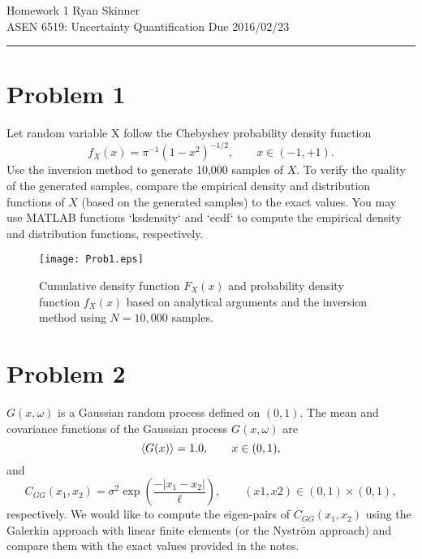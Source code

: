 \documentclass[11pt]{article}
\begin{document}
\renewcommand*{\arraystretch}{1.5}

\pagestyle{fancyplain}
\lhead{}
\chead{}
\rhead{}
\cfoot{\hrule \thepage}

\noindent
{\Large Homework 1}
\hfill
{\large Ryan Skinner}
\\[0.5ex]
{\large ASEN 6519: Uncertainty Quantification}
\hfill
{\large Due 2016/02/23}\\
\hrule
\vspace{6pt}

\section*{Problem 1} %

Let random variable X follow the Chebyshev probability density function
\begin{equation}
f_X(x) = \pi^{-1} (1 - x^2)^{-1/2}, \qquad x \in (-1, +1).
\end{equation}
Use the inversion method to generate 10,000 samples of $X$. To verify the quality of the generated samples, compare the empirical density and distribution functions of $X$ (based on the generated samples) to the exact values. You may use MATLAB functions `ksdensity` and `ecdf` to compute the empirical density and distribution functions, respectively.

\begin{figure}[h]
\centering
\texttt{[image: Prob1.eps]}
\caption{Cumulative density function $F_X(x)$ and probability density function $f_X(x)$ based on analytical arguments and the inversion method using $N=10,\!000$ samples.}
\end{figure}

\section*{Problem 2} %

$G(x, \omega)$ is a Gaussian random process defined on $(0, 1)$. The mean and covariance functions of the Gaussian process $G(x, \omega)$ are
\begin{equation}
\left\langle G(x) \right\rangle = 1.0, \qquad x \in (0,1),
\end{equation}
and
\begin{equation}
C_{GG}(x_1,x_2) = \sigma^2 \exp \left( \frac{- | x_1-x_2 | }{\ell} \right), \qquad (x1,x2) \in (0,1) \times (0,1),
\end{equation}
respectively. We would like to compute the eigen-pairs of $C_{GG}(x_1,x_2)$ using the Galerkin approach with linear finite elements (or the Nystr\"om approach) and compare them with the exact values provided in the notes.
\end{document}
